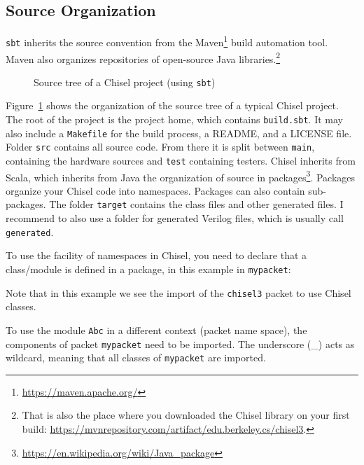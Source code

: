 \documentclass[%
    10pt,
    headinclude, footexclude,
    openright, %
    notitlepage,
    cleardoubleempty,
    headsepline,
    pointlessnumbers,
    bibtotoc, idxtotoc,
    ]{scrbook}
\newcommand{\code}[1]{{\small{\texttt{#1}}}}
\newcommand{\myref}[2]{\href{#1}{#2}}
\renewcommand{\myref}[2]{{#2}{\footnote{\url{#1}}}}
\begin{document}
\subsection{Source Organization}

\code{sbt} inherits the source convention from the \myref{https://maven.apache.org/}{Maven}
build automation tool. Maven also organizes repositories of open-source Java libraries.\footnote{That is
also the place where you downloaded the Chisel library on your first build:
\url{https://mvnrepository.com/artifact/edu.berkeley.cs/chisel3}.}

\begin{figure}
\caption{Source tree of a Chisel project (using \code{sbt})}
\label{fig:folders}
\end{figure}

Figure~\ref{fig:folders} shows the organization of the source tree of a typical Chisel project.
The root of the project is the project home, which contains \code{build.sbt}.
It may also include a \code{Makefile} for the build process, a README, and a LICENSE file.
Folder \code{src} contains all source code. From there it is split between \code{main},
containing the hardware sources and \code{test} containing testers.
Chisel inherits from Scala, which inherits from Java the organization of source
in \myref{https://en.wikipedia.org/wiki/Java_package}{packages}.
Packages organize your Chisel code into namespaces. Packages can also contain
sub-packages.
The folder \code{target} contains the class files and other generated files.
I recommend to also use a folder for generated Verilog files, which is usually
call \code{generated}.


To use the facility of namespaces in Chisel, you need to declare that a class/module
is defined in a package, in this example in \code{mypacket}:


\noindent Note that in this example we see the import of the \code{chisel3} packet
to use Chisel classes.

To use the module \code{Abc} in a different context (packet name space),
the components of packet \code{mypacket} need to be imported. The underscore
(\_) acts as wildcard, meaning that all classes of \code{mypacket} are imported.

\end{document}
